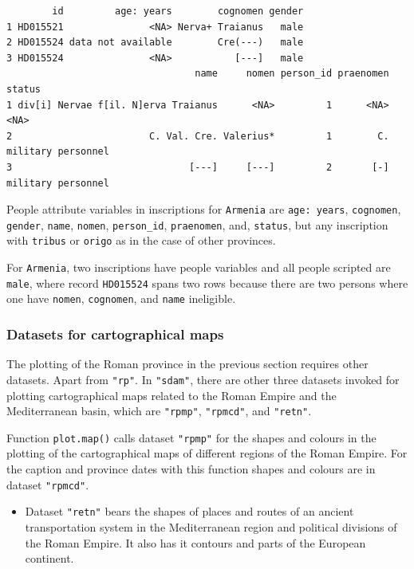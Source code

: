 \documentclass[a4paper,11pt]{memoir}
\providecommand{\tightlist}{%
  \setlength{\itemsep}{0pt}\setlength{\parskip}{0pt}}
\begin{document}
\begin{verbatim}
        id         age: years        cognomen gender
1 HD015521               <NA> Nerva+ Traianus   male
2 HD015524 data not available        Cre(---)   male
3 HD015524               <NA>           [---]   male
                                 name     nomen person_id praenomen             status
1 div[i] Nervae f[il. N]erva Traianus      <NA>         1      <NA>               <NA>
2                        C. Val. Cre. Valerius*         1        C. military personnel
3                               [---]     [---]         2       [-] military personnel
\end{verbatim}

People attribute variables in inscriptions for \texttt{Armenia} are
\texttt{age:\ years}, \texttt{cognomen}, \texttt{gender}, \texttt{name},
\texttt{nomen}, \texttt{person\_id}, \texttt{praenomen}, and,
\texttt{status}, but any inscription with \texttt{tribus} or
\texttt{origo} as in the case of other provinces.

For \texttt{Armenia}, two inscriptions have people variables and all
people scripted are \texttt{male}, where record \texttt{HD015524} spans
two rows because there are two persons where one have \texttt{nomen},
\texttt{cognomen}, and \texttt{name} ineligible.

\hypertarget{datasets-for-cartographical-maps}{%
\subsubsection{Datasets for cartographical
maps}\label{datasets-for-cartographical-maps}}

The plotting of the Roman province in the previous section requires
other datasets. Apart from \texttt{"rp"}. In \texttt{"sdam"}, there are
other three datasets invoked for plotting cartographical maps related to
the Roman Empire and the Mediterranean basin, which are \texttt{"rpmp"},
\texttt{"rpmcd"}, and \texttt{"retn"}.

Function \texttt{plot.map()} calls dataset \texttt{"rpmp"} for the
shapes and colours in the plotting of the cartographical maps of
different regions of the Roman Empire. For the caption and province
dates with this function shapes and colours are in dataset
\texttt{"rpmcd"}.

\begin{itemize}
\tightlist
\item
  Dataset \texttt{"retn"} bears the shapes of places and routes of an
  ancient transportation system in the Mediterranean region and
  political divisions of the Roman Empire. It also has it contours and
  parts of the European continent.
\end{itemize}
\end{document}
